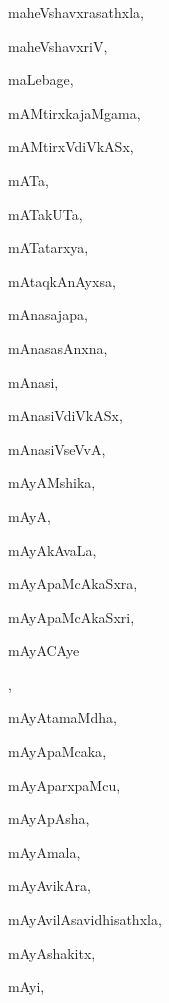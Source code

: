 \begin{multicols}{3}
{\noindent
{maheVshavxrasathxla}, \pageref{maheVshavxrasathxla}

\noindent
{maheVshavxriV}, \pageref{maheVshavxriV}

\noindent
{maLebage}, \pageref{maLebage}

\noindent
{mAMtirxkajaMgama}, \pageref{mAMtirxkajaMgama}

\noindent
{mAMtirxVdiVkASx}, \pageref{mAMtirxVdiVkASx}

\noindent
{mATa}, \pageref{mATa}

\noindent
{mATakUTa}, \pageref{mATakUTa}

\noindent
{mATatarxya}, \pageref{mATatarxya}

\noindent
{mAtaqkAnAyxsa}, \pageref{mAtaqkAnAyxsa}

\noindent
{mAnasajapa}, \pageref{mAnasajapa}

\noindent
{mAnasasAnxna}, \pageref{mAnasasAnxna}

\noindent
{mAnasi}, \pageref{mAnasi}

\noindent
{mAnasiVdiVkASx}, \pageref{mAnasiVdiVkASx}

\noindent
{mAnasiVseVvA}, \pageref{mAnasiVseVvA}

\noindent
{mAyAMshika}, \pageref{mAyAMshika}

\noindent
{mAyA}, \pageref{mAyA}

\noindent
{mAyAkAvaLa}, \pageref{mAyAkAvaLa}

\noindent
{mAyApaMcAkaSxra}, \pageref{mAyApaMcAkaSxra}

\noindent
{mAyApaMcAkaSxri}, \pageref{mAyApaMcAkaSxri}

\noindent
{mAyACAye}

\noindent
{}, \pageref{mAyACAyeCAyAmAye}

\noindent
{mAyAtamaMdha}, \pageref{mAyAtamaMdha}

\noindent
{mAyApaMcaka}, \pageref{mAyApaMcaka}

\noindent
{mAyAparxpaMcu}, \pageref{mAyAparxpaMcu}

\noindent
{mAyApAsha}, \pageref{mAyApAsha}

\noindent
{mAyAmala}, \pageref{mAyAmala}

\noindent
{mAyAvikAra}, \pageref{mAyAvikAra}

\noindent
{mAyAvilAsavidhisathxla}, \pageref{mAyAvilAsavidhisathxla}

\noindent
{mAyAshakitx}, \pageref{mAyAshakitx}

\noindent
{mAyi}, \pageref{mAyi}

}
\end{multicols}
